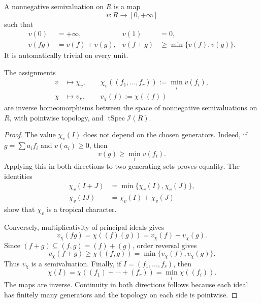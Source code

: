 A nonnegative semivaluation on $R$ is a map
\[
                       v:R\longrightarrow[0,+\infty]
\]
such that
\[
\begin{aligned}
 v(0)&=+\infty,&v(1)&=0,\\
 v(fg)&=v(f)+v(g),&
 v(f+g)&\geq\min\{v(f),v(g)\}.
\end{aligned}
\tag{58.5}\label{eq:ts-semivaluation}
\]
It is automatically trivial on every unit.

\begin{theorem}\label{thm:ts-affine-homeomorphism}
The assignments
\[
\begin{aligned}
 v&\longmapsto
   \chi_v,\qquad
   \chi_v((f_1,\ldots,f_r))
       :=\min_i v(f_i),\\
 \chi&\longmapsto
   v_\chi,\qquad
   v_\chi(f):=\chi((f))
\end{aligned}
\tag{58.6}\label{eq:ts-affine-correspondence}
\]
are inverse homeomorphisms between the space of nonnegative
semivaluations on $R$, with pointwise topology, and
$\operatorname{tSpec}\mathscr I(R)$.
\end{theorem}

\begin{proof}
The value $\chi_v(I)$ does not depend on the chosen generators.
Indeed, if $g=\sum a_if_i$ and $v(a_i)\geq0$, then
\[
                      v(g)\geq\min_i v(f_i).
\]
Applying this in both directions to two generating sets proves equality.
The identities
\[
\begin{aligned}
 \chi_v(I+J)&=\min\{\chi_v(I),\chi_v(J)\},\\
 \chi_v(IJ)&=\chi_v(I)+\chi_v(J)
\end{aligned}
\]
show that $\chi_v$ is a tropical character.

Conversely, multiplicativity of principal ideals gives
\[
 v_\chi(fg)=\chi((f)(g))=v_\chi(f)+v_\chi(g).
\]
Since $(f+g)\subseteq(f,g)=(f)+(g)$, order reversal gives
\[
 v_\chi(f+g)\geq
 \chi((f,g))
 =\min\{v_\chi(f),v_\chi(g)\}.
\]
Thus $v_\chi$ is a semivaluation.
Finally, if $I=(f_1,\ldots,f_r)$, then
\[
 \chi(I)=\chi((f_1)+\cdots+(f_r))
        =\min_i\chi((f_i)).
\]
The maps are inverse.
Continuity in both directions follows because each ideal has finitely many
generators and the topology on each side is pointwise.
\end{proof}

